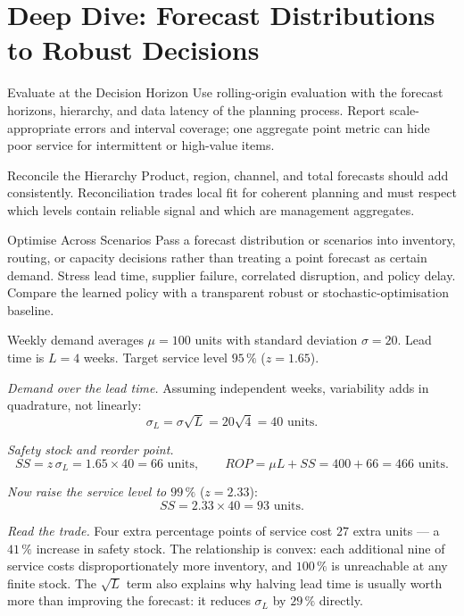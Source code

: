 \section{Deep Dive: Forecast Distributions to Robust Decisions}
\begin{v3topic}{Evaluate at the Decision Horizon}
Use rolling-origin evaluation with the forecast horizons, hierarchy, and data
latency of the planning process.
Report scale-appropriate errors and interval coverage; one aggregate point
metric can hide poor service for intermittent or high-value items.

\end{v3topic}
\begin{v3topic}{Reconcile the Hierarchy}
Product, region, channel, and total forecasts should add consistently.
Reconciliation trades local fit for coherent planning and must respect which
levels contain reliable signal and which are management aggregates.

\end{v3topic}
\begin{v3topic}{Optimise Across Scenarios}
Pass a forecast distribution or scenarios into inventory, routing, or capacity
decisions rather than treating a point forecast as certain demand.
Stress lead time, supplier failure, correlated disruption, and policy delay.
Compare the learned policy with a transparent robust or stochastic-optimisation
baseline.
\end{v3topic}


\begin{workedexample}
Weekly demand averages $\mu = 100$ units with standard deviation
$\sigma = 20$. Lead time is $L = 4$ weeks. Target service level $95\,\%$
($z = 1.65$).

\emph{Demand over the lead time.} Assuming independent weeks, variability adds
in quadrature, not linearly:
\[
  \sigma_L = \sigma\sqrt{L} = 20\sqrt{4} = 40 \text{ units.}
\]

\emph{Safety stock and reorder point.}
\[
  SS = z\,\sigma_L = 1.65\times40 = 66 \text{ units},
  \qquad
  ROP = \mu L + SS = 400 + 66 = 466 \text{ units.}
\]

\emph{Now raise the service level to $99\,\%$} ($z = 2.33$):
\[
  SS = 2.33\times40 = 93 \text{ units.}
\]

\emph{Read the trade.} Four extra percentage points of service cost $27$ extra
units --- a $41\,\%$ increase in safety stock. The relationship is convex: each
additional nine of service costs disproportionately more inventory, and
$100\,\%$ is unreachable at any finite stock. The $\sqrt{L}$ term also explains
why halving lead time is usually worth more than improving the forecast: it
reduces $\sigma_L$ by $29\,\%$ directly.
\end{workedexample}

